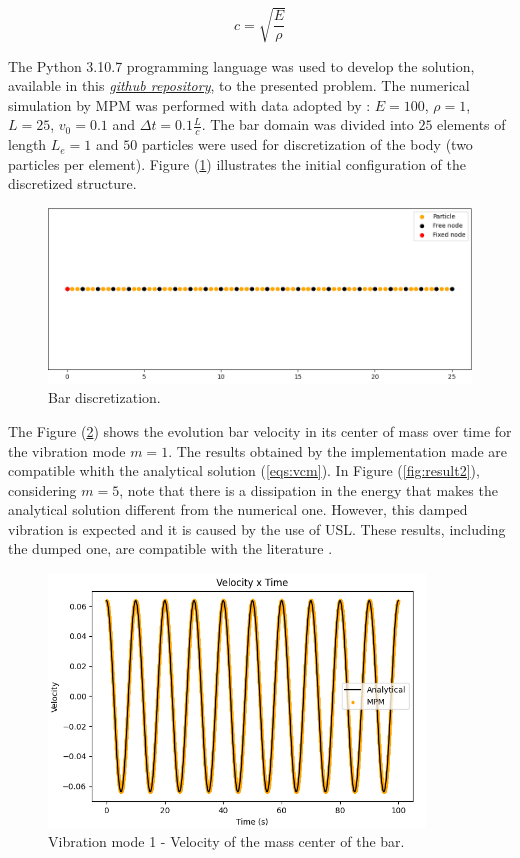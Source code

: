 \documentclass[preprint,12pt]{elsarticle}
\begin{document}
        \begin{equation}
            c = \sqrt{\frac{E}{\rho}}
            \label{eq:c}
        \end{equation}


	The Python 3.10.7 programming language was used to develop the solution, available in this \textit{\href{https://github.com/lorranfoliveira/mini_mpm}{github repository}}, to the presented problem. The numerical simulation by MPM was performed with data adopted by \cite{bardenhagen_energy_2002}: $E=100$, $\rho=1$, $L=25$, $v_0=0.1$ and $\Delta t=0.1\frac{L}{c}$. The bar domain was divided into $25$ elements of length $L_e=1$ and $50$ particles were used for discretization of the body (two particles per element). Figure (\ref{fig:domain}) illustrates the initial configuration of the discretized structure.
	
	\begin{figure}
    	\includegraphics[width=\linewidth]{exemplo_dominio.png}
    	\caption{Bar discretization.}
    	\centering
    	\label{fig:domain}
    \end{figure}
    
    The Figure (\ref{fig:result1}) shows the evolution bar velocity in its center of mass over time for the vibration mode $m=1$. The results obtained by the implementation made are compatible whith the analytical solution (\ref{eqs:vcm}). In Figure (\ref{fig:result2}), considering $m=5$, note that there is a dissipation in the energy that makes the analytical solution different from the numerical one. However, this damped vibration is expected and it is caused by the use of USL. These results, including the dumped one, are compatible with the literature \cite{bardenhagen_energy_2002}.
	
	\begin{figure}
    	\includegraphics[width=10cm]{exemplo_1_resultado.png}
    	\centering
    	\caption{Vibration mode 1 - Velocity of the mass center of the bar.}
    	\label{fig:result1}
    \end{figure}
    
\end{document}
